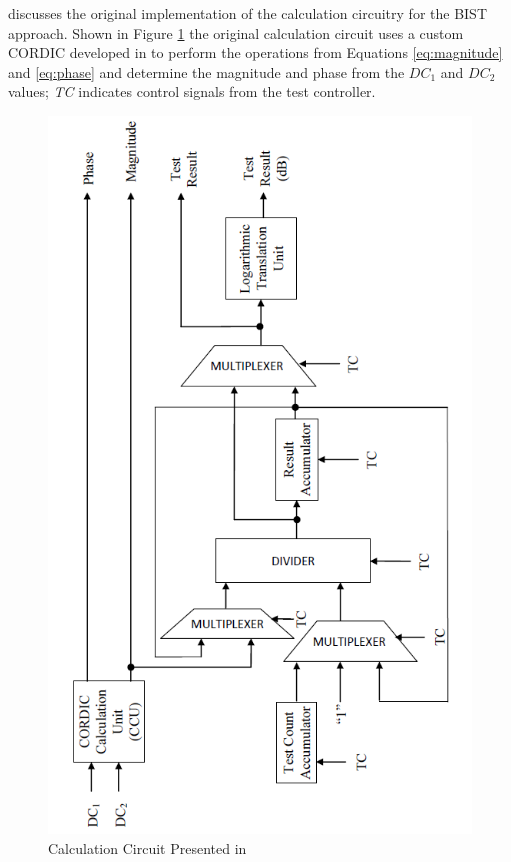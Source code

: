 \documentclass[12pt]{report}
\begin{document}
\cite{joey} discusses the original implementation of the calculation circuitry for the BIST approach.  Shown in Figure \ref{fig:joeycalc} the original calculation circuit uses a custom CORDIC developed in \cite{joey} to perform the operations from Equations \ref{eq:magnitude} and \ref{eq:phase} and determine the magnitude and phase from the $DC_1$ and $DC_2$ values; \textit{TC} indicates control signals from the test controller.
\begin{figure}
	\begin{center}
		\includegraphics[scale=1]{images/joey-calculation}
	\end{center}
	\caption{Calculation Circuit Presented in \cite{joey}}
	\label{fig:joeycalc}
\end{figure}
\end{document}
